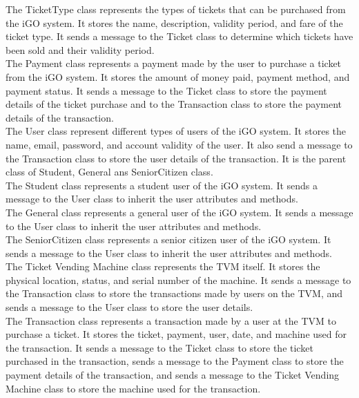 \documentclass[a4paper, 11pt]{report}
\begin{document}
The TicketType class represents the types of tickets that can be purchased from the iGO system. It stores the name, description, validity period, and fare of the ticket type. It sends a message to the Ticket class to determine which tickets have been sold and their validity period.\\

The Payment class represents a payment made by the user to purchase a ticket from the iGO system. It stores the amount of money paid, payment method, and payment status. It sends a message to the Ticket class to store the payment details of the ticket purchase and to the Transaction class to store the payment details of the transaction.\\

The User class represent different types of users of the iGO system. It stores the name, email, password, and account validity of the user. It also send a message to the Transaction class to store the user details of the transaction. It is the parent class of Student, General ans SeniorCitizen class.\\

The Student class represents a student user of the iGO system. It sends a message to the User class to inherit the user attributes and methods.\\
The General class represents a general user of the iGO system. It sends a message to the User class to inherit the user attributes and methods.\\
The SeniorCitizen class represents a senior citizen user of the iGO system. It sends a message to the User class to inherit the user attributes and methods.\\

The Ticket Vending Machine class represents the TVM itself. It stores the physical location, status, and serial number of the machine. It sends a message to the Transaction class to store the transactions made by users on the TVM, and sends a message to the User class to store the user details.\\

The Transaction class represents a transaction made by a user at the TVM to purchase a ticket. It stores the ticket, payment, user, date, and machine used for the transaction. It sends a message to the Ticket class to store the ticket purchased in the transaction, sends a message to the Payment class to store the payment details of the transaction, and sends a message to the Ticket Vending Machine class to store the machine used for the transaction.\\
\end{document}
